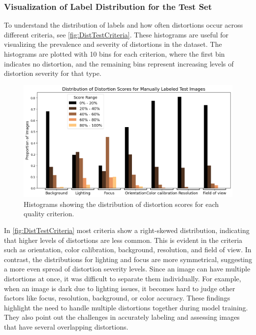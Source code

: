 \subsubsection{Visualization of Label Distribution for the Test Set}
\label{subsub:LabelDist}
To understand the distribution of labels and how often distortions occur across different criteria, see \autoref{fig:DistTestCriteria}. These histograms are useful for visualizing the prevalence and severity of distortions in the dataset. The histograms are plotted with 10 bins for each criterion, where the first bin indicates no distortion, and the remaining bins represent increasing levels of distortion severity for that type. \par
\begin{figure}[ht]
    \centering
    \includegraphics[keepaspectratio,width=15cm]{img/Distribution_test_criteria.png}
    \caption{Histograms showing the distribution of distortion scores for each quality criterion.}
    \label{fig:DistTestCriteria}
\end{figure}
\noindent
In \autoref{fig:DistTestCriteria} most criteria show a right-skewed distribution, indicating that higher levels of distortions are less common. This is evident in the criteria such as orientation, color calibration, background, resolution, and field of view. In contrast, the distributions for lighting and focus are more symmetrical, suggesting a more even spread of distortion severity levels. Since an image can have multiple distortions at once, it was difficult to separate them individually. For example, when an image is dark due to lighting issues, it becomes hard to judge other factors like focus, resolution, background, or color accuracy. These findings highlight the need to handle multiple distortions together during model training. They also point out the challenges in accurately labeling and assessing images that have several overlapping distortions. \par

